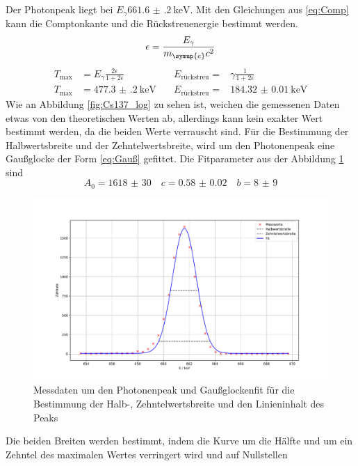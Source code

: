 \FloatBarrier
Der Photonpeak liegt bei $E_{\gamma}\SI{661.6(2)}{\kilo\eV}$. Mit den Gleichungen aus \eqref{eq:Comp} kann 
die Comptonkante und die Rückstreuenergie bestimmt werden.
\begin{equation*}
  \epsilon = \frac{E_{\gamma}}{m_{\symup{e}}c^2}
\end{equation*}
\begin{align}
  T_{\text{max}} &= E_{\gamma}\frac{2\epsilon}{1+2\epsilon} \quad &E_{\text{rückstreu}} =&{\gamma}\frac{1}{1+2\epsilon} \label{eq:Comp}\\
  T_{\text{max}} &= \SI{477.3(2)}{\kilo\eV} \quad &E_{\text{rückstreu}} =& \SI{184.32(1)}{\kilo\eV}
\end{align}
Wie an Abbildung \ref{fig:Cs137_log} zu sehen ist, weichen die gemessenen Daten etwas von den theoretischen Werten ab, allerdings 
kann kein exakter Wert bestimmt werden, da die beiden Werte verrauscht sind.
Für die Bestimmung der Halbwertsbreite und der Zehntelwertsbreite, wird um den Photonenpeak eine Gaußglocke der Form 
\eqref{eq:Gauß} gefittet.
Die Fitparameter aus der Abbildung \ref{fig:02_fit} sind 
\begin{equation*}
  A_0 = \num{1618(30)}\quad c = \num{0.58(2)} \quad b = \num{8(9)}
\end{equation*}
\FloatBarrier
\begin{figure}
  \centering
  \caption{Messdaten um den Photonenpeak und Gaußglockenfit für die Bestimmung der Halb-, Zehntelwertsbreite und den Linieninhalt des Peaks}
  \label{fig:02_fit}
  \includegraphics[width=\textwidth,keepaspectratio]{figure/02_peak_fit.pdf}
\end{figure}
\FloatBarrier
Die beiden Breiten werden bestimmt, indem die Kurve um die Hälfte und um ein Zehntel des maximalen Wertes verringert wird und auf Nullstellen 
